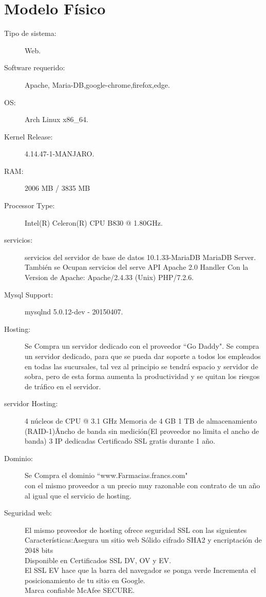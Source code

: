 \chapter{Modelo Físico} 

\begin{description}

	\item[Tipo de sistema:] Web.
	\item[Software requerido:]Apache, Maria-DB,google-chrome,firefox,edge.
	\item[OS:] Arch Linux x86\_64.
	\item[Kernel Release:] 4.14.47-1-MANJARO.
	\item[RAM:] 2006 MB / 3835 MB
	\item[Processor Type:] Intel(R) Celeron(R) CPU B830 @ 1.80GHz.
	\item[servicios:] servicios del servidor de base de datos 10.1.33-MariaDB MariaDB Server.\\También se Ocupan servicios del serve API Apache 2.0 Handler
Con la Version de Apache:	Apache/2.4.33 (Unix) PHP/7.2.6.
	\item[Mysql Support:] mysqlnd 5.0.12-dev - 20150407.
	\item[Hosting:]Se Compra un servidor dedicado con el proveedor ``Go Daddy".
	Se compra un servidor dedicado, para que se pueda dar soporte a  todos los empleados en todas las sucursales, tal vez al principio se tendrá espacio y servidor de sobra, pero de esta forma aumenta la productividad y se quitan los riesgos de tráfico en el servidor.
	\item[servidor Hosting:]4 núcleos de CPU @ 3.1 GHz
Memoria de 4 GB
1 TB de almacenamiento (RAID-1)\^
Ancho de banda sin medición(El proveedor no limita el ancho de banda) 
3 IP dedicadas
Certificado SSL gratis durante 1 año.
	\item[Dominio:] Se Compra el dominio ``www.Farmacias.francs.com"\\  con el mismo proveedor a un precio muy razonable con contrato de un año al igual que el servicio de hosting.
	\item[Seguridad web:]El mismo proveedor de hosting ofrece seguridad SSL
	con las siguientes Características:Asegura un sitio web
Sólido cifrado SHA2 y encriptación de 2048 bits\\
Disponible en Certificados SSL DV, OV y EV.\\
El SSL EV hace que la barra del navegador se ponga verde 
Incrementa el posicionamiento de tu sitio en Google.\\
Marca confiable McAfee SECURE.\\
\end{description}
